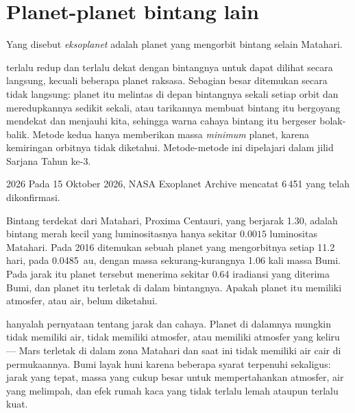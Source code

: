 \section{Planet-planet bintang lain}

\begin{definition}[Eksoplanet]\label{def:g10:habitable-planet:exoplanet}
Yang disebut \emph{eksoplanet} adalah planet yang
mengorbit bintang selain Matahari.
\end{definition}

 terlalu redup dan terlalu dekat dengan bintangnya untuk dapat
dilihat secara langsung, kecuali beberapa planet raksasa. Sebagian besar
ditemukan secara tidak langsung: planet itu melintas di depan bintangnya sekali
setiap orbit dan meredupkannya sedikit sekali, atau tarikannya membuat bintang
itu bergoyang mendekat dan menjauhi kita, sehingga warna cahaya bintang itu
bergeser bolak-balik. Metode kedua hanya memberikan massa \emph{minimum}
planet, karena kemiringan orbitnya tidak diketahui. Metode-metode ini
dipelajari dalam jilid Sarjana Tahun ke-3.

\begin{dated}{2026}
Pada 15 Oktober 2026, NASA Exoplanet Archive mencatat 6\,451  yang
telah dikonfirmasi.
\end{dated}

\begin{example}[Proxima b]\label{ex:g10:habitable-planet:proxima}
Bintang terdekat dari Matahari, Proxima Centauri, yang berjarak
\qty{1.30}{\parsec}, adalah bintang merah kecil yang luminositasnya hanya
sekitar $0.0015$ luminositas Matahari. Pada 2016 ditemukan sebuah planet yang
mengorbitnya setiap 11.2 hari, pada \qty{0.0485}{au}, dengan massa
sekurang-kurangnya 1.06 kali massa Bumi. Pada jarak itu planet tersebut
menerima sekitar 0.64 iradiansi yang diterima Bumi, dan planet itu terletak di
dalam  bintangnya. Apakah planet itu memiliki atmosfer, atau
air, belum diketahui.
\end{example}

\begin{remark}\label{rem:g10:habitable-planet:inhabited}
 hanyalah pernyataan tentang jarak dan cahaya. Planet di
dalamnya mungkin tidak memiliki air, tidak memiliki atmosfer, atau memiliki
atmosfer yang keliru --- Mars terletak di dalam zona Matahari dan saat ini
tidak memiliki air cair di permukaannya. Bumi layak huni karena beberapa
syarat terpenuhi sekaligus: jarak yang tepat, massa yang cukup besar untuk
mempertahankan atmosfer, air yang melimpah, dan efek rumah kaca yang tidak
terlalu lemah ataupun terlalu kuat.
\end{remark}

